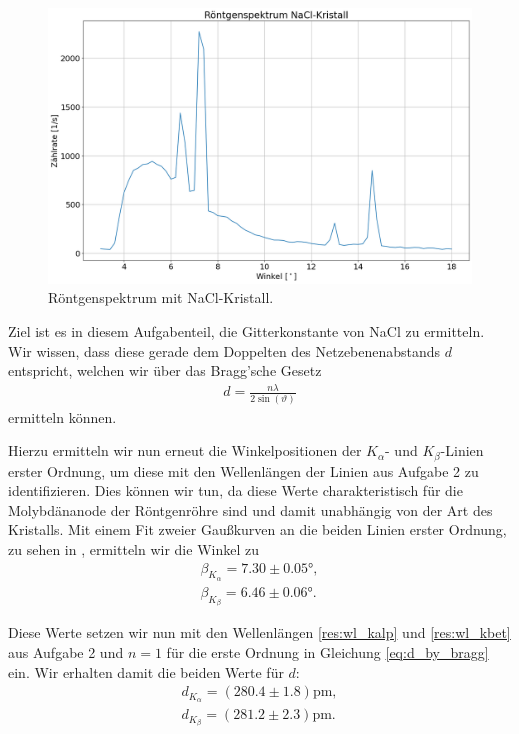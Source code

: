 \begin{figure}[H]
  \centering
  \includegraphics[width=.9\textwidth]{files/plots/spektrum_nacl_komplett.png}
  \caption{Röntgenspektrum mit NaCl-Kristall.}
  \label{fig:spektrum_nacl_komplett}
\end{figure}

Ziel ist es in diesem Aufgabenteil, die Gitterkonstante von NaCl zu ermitteln. Wir wissen, dass diese gerade dem Doppelten des Netzebenenabstands $d$ entspricht, welchen wir über das Bragg'sche Gesetz 
\begin{align}
  d = \frac{n \lambda}{2 \sin(\vartheta)}\label{eq:d_by_bragg}
\end{align}
ermitteln können.

Hierzu ermitteln wir nun erneut die Winkelpositionen der $K_{\alpha}$- und $K_{\beta}$-Linien erster Ordnung, um diese mit den Wellenlängen der Linien aus Aufgabe 2 zu identifizieren. Dies können wir tun, da diese Werte charakteristisch für die Molybdänanode der Röntgenröhre sind und damit unabhängig von der Art des Kristalls. Mit einem Fit zweier Gaußkurven an die beiden Linien erster Ordnung, zu sehen in , ermitteln wir die Winkel zu
\begin{align}
  \beta_{K_{\alpha}} = 7.30 \pm 0.05\si{\degree},\\[0.5em]
  \beta_{K_{\beta}} = 6.46 \pm 0.06\si{\degree}.
\end{align}

Diese Werte setzen wir nun mit den Wellenlängen \eqref{res:wl_kalp} und \eqref{res:wl_kbet} aus Aufgabe 2 und $n = 1$ für die erste Ordnung in Gleichung \eqref{eq:d_by_bragg} ein. Wir erhalten damit die beiden Werte für $d$:
\begin{align}
  d_{K_{\alpha}} = (280.4 \pm 1.8)\si{\pico\meter},\\[0.5em]
  d_{K_{\beta}} =(281.2 \pm 2.3)\si{\pico\meter}.
\end{align}


